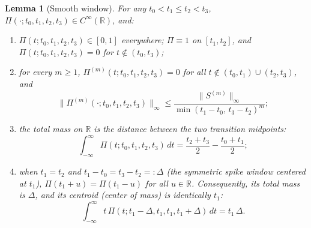 \documentclass[11pt]{article}
\newtheorem{lemma}[theorem]{Lemma}
\newcommand{\R}{\mathbb{R}}
\begin{document}
\begin{lemma}[Smooth window]
\label{lem:window}
For any $t_0 < t_1 \le t_2 < t_3$, $\Pi(\cdot; t_0, t_1, t_2, t_3) \in C^\infty(\R)$, and:
\begin{enumerate}
\item[(i)] $\Pi(t; t_0, t_1, t_2, t_3) \in [0, 1]$ everywhere; $\Pi \equiv 1$ on $[t_1, t_2]$, and $\Pi(t; t_0, t_1, t_2, t_3) = 0$ for $t \notin (t_0, t_3)$;
\item[(ii)] for every $m \ge 1$, $\Pi^{(m)}(t; t_0, t_1, t_2, t_3) = 0$ for all $t \notin (t_0, t_1) \cup (t_2, t_3)$, and
\[
\|\Pi^{(m)}(\cdot; t_0, t_1, t_2, t_3)\|_\infty \le \frac{\|S^{(m)}\|_\infty}{\min(t_1-t_0,\, t_3-t_2)^m};
\]
\item[(iii)] the total mass on $\R$ is the distance between the two transition midpoints:
\begin{equation}
\label{eq:Pimass}
\int_{-\infty}^\infty \Pi(t; t_0, t_1, t_2, t_3)\,dt = \frac{t_2+t_3}{2} - \frac{t_0+t_1}{2};
\end{equation}
\item[(iv)] when $t_1 = t_2$ and $t_1 - t_0 = t_3 - t_2 =: \Delta$ (the symmetric spike window centered at $t_1$), $\Pi(t_1+u) = \Pi(t_1-u)$ for all $u \in \R$. Consequently, its total mass is $\Delta$, and its centroid (center of mass) is identically $t_1$:
\begin{equation}
\label{eq:Picentroid}
\int_{-\infty}^\infty t\,\Pi(t; t_1-\Delta, t_1, t_1, t_1+\Delta)\,dt = t_1\,\Delta.
\end{equation}
\end{enumerate}
\end{lemma}
\end{document}
